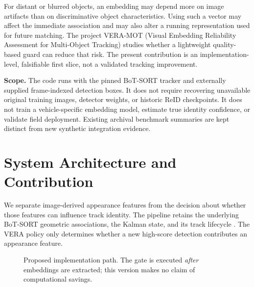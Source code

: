 \documentclass[11pt,a4paper]{article}
\begin{document}
For distant or blurred objects, an embedding may depend more on image artifacts than on discriminative object characteristics. Using such a vector may affect the immediate association and may also alter a running representation used for future matching. The project VERA-MOT (Visual Embedding Reliability Assessment for Multi-Object Tracking) studies whether a lightweight quality-based guard can reduce that risk. The present contribution is an implementation-level, falsifiable first slice, not a validated tracking improvement.

\textbf{Scope.} The code runs with the pinned BoT-SORT tracker and externally supplied frame-indexed detection boxes. It does not require recovering unavailable original training images, detector weights, or historic ReID checkpoints. It does not train a vehicle-specific embedding model, estimate true identity confidence, or validate field deployment. Existing archival benchmark summaries are kept distinct from new synthetic integration evidence.

\section{System Architecture and Contribution}
We separate image-derived appearance features from the decision about whether those features can influence track identity. The pipeline retains the underlying BoT-SORT geometric associations, the Kalman state, and its track lifecycle \cite{aharon2022}. The VERA policy only determines whether a new high-score detection contributes an appearance feature.

\begin{figure}[htbp]
\centering
{}
\caption{Proposed implementation path. The gate is executed \emph{after} embeddings are extracted; this version makes no claim of computational savings.}
\label{fig:architecture}
\end{figure}
\end{document}
